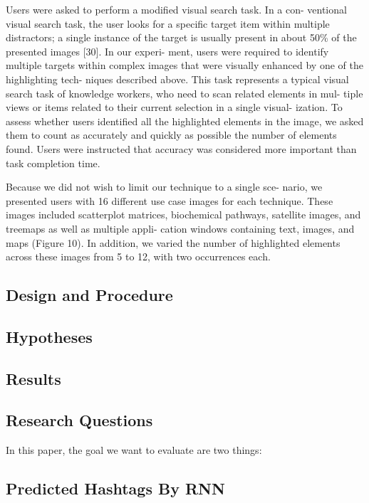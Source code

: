 Users were asked to perform a modiﬁed visual search task. In a con- ventional visual search task, the user looks for a speciﬁc target item within multiple distractors; a single instance of the target is usually present in about 50\% of the presented images [30]. In our experi- ment, users were required to identify multiple targets within complex images that were visually enhanced by one of the highlighting tech- niques described above. This task represents a typical visual search task of knowledge workers, who need to scan related elements in mul- tiple views or items related to their current selection in a single visual- ization. To assess whether users identiﬁed all the highlighted elements in the image, we asked them to count as accurately and quickly as possible the number of elements found. Users were instructed that accuracy was considered more important than task completion time.

Because we did not wish to limit our technique to a single sce- nario, we presented users with 16 different use case images for each technique. These images included scatterplot matrices, biochemical pathways, satellite images, and treemaps as well as multiple appli- cation windows containing text, images, and maps (Figure 10). In addition, we varied the number of highlighted elements across these images from 5 to 12, with two occurrences each.


\subsection{Design and Procedure}

\subsection{Hypotheses}

\subsection{Results}


\subsection{Research Questions}

In this paper, the goal we want to evaluate are two things:

\subsection{Predicted Hashtags By RNN}

